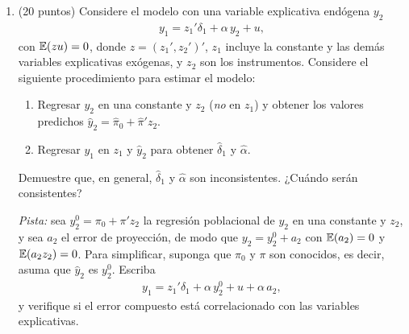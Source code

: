 \documentclass[letterpaper,11pt]{article}
\begin{document}
\begin{enumerate}

\item (20 puntos) Considere el modelo con una variable explicativa endógena $y_2$
    \begin{align*}
    y_{1}=z_{1}'\delta_1+\alpha\, y_{2}+u,
    \end{align*}
    con $\operatorname{\mathbb{E}}(zu)=0$, donde $z=(z_1',z_2')'$, $z_1$ incluye la constante y las demás variables
    explicativas exógenas, y $z_2$ son los instrumentos. Considere el siguiente procedimiento
    para estimar el modelo:
    \begin{enumerate}
        \item Regresar $y_2$ en una constante y $z_2$ (\emph{no} en $z_1$) y obtener los valores
            predichos $\hat y_2=\hat\pi_0+\hat\pi'z_2$.
        \item Regresar $y_1$ en $z_1$ y $\hat y_2$ para obtener $\hat\delta_1$ y $\hat\alpha$.
    \end{enumerate}
    Demuestre que, en general, $\hat\delta_1$ y $\hat\alpha$ son inconsistentes. ¿Cuándo serán
    consistentes?

    \emph{Pista:} sea $y_2^0=\pi_0+\pi'z_2$ la regresión poblacional de $y_2$ en una constante
    y $z_2$, y sea $a_2$ el error de proyección, de modo que $y_2=y_2^0+a_2$ con $\operatorname{\mathbb{E}}(a_2)=0$ y
    $\operatorname{\mathbb{E}}(a_2z_2)=0$. Para simplificar, suponga que $\pi_0$ y $\pi$ son conocidos, es decir,
    asuma que $\hat y_2$ es $y_2^0$. Escriba
    \begin{align*}
    y_1=z_1'\delta_1+\alpha\, y_2^0+u+\alpha\, a_2,
    \end{align*}
    y verifique si el error compuesto está correlacionado con las variables explicativas.


\end{enumerate}
\end{document}
